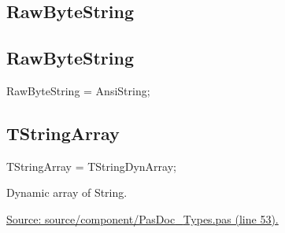 \documentclass{report}
\newif\ifpdf
\begin{document}
\subsection*{\large{\textbf{RawByteString}}\normalsize\hspace{1ex}\hrulefill}
\else
\subsection*{RawByteString}
\fi
\label{PasDoc_Types-RawByteString}
\begin{list}{}{
\setlength{\itemindent}{0cm}
\setlength{\listparindent}{0cm}
\setlength{\leftmargin}{\evensidemargin}
\addtolength{\leftmargin}{\tmplength}
\settowidth{\labelsep}{X}
\addtolength{\leftmargin}{\labelsep}
\setlength{\labelwidth}{\tmplength}
}
\item[\textbf{Declaration}\hfill]
\ifpdf
\begin{flushleft}
\fi
\begin{ttfamily}
RawByteString = AnsiString;\end{ttfamily}

\ifpdf
\end{flushleft}
\fi

\end{list}
\ifpdf
\subsection*{\large{\textbf{TStringArray}}\normalsize\hspace{1ex}\hrulefill}
\else
\subsection*{TStringArray}
\fi
\label{PasDoc_Types-TStringArray}
\begin{list}{}{
\setlength{\itemindent}{0cm}
\setlength{\listparindent}{0cm}
\setlength{\leftmargin}{\evensidemargin}
\addtolength{\leftmargin}{\tmplength}
\settowidth{\labelsep}{X}
\addtolength{\leftmargin}{\labelsep}
\setlength{\labelwidth}{\tmplength}
}
\item[\textbf{Declaration}\hfill]
\ifpdf
\begin{flushleft}
\fi
\begin{ttfamily}
TStringArray = TStringDynArray;\end{ttfamily}

\ifpdf
\end{flushleft}
\fi

\par
\item[\textbf{Description}]
Dynamic array of String.\par
\href{https://github.com/pasdoc/pasdoc/blob/master/source/component/PasDoc_Types.pas#L53}{Source: source/component/PasDoc{\_}Types.pas (line 53).}

\end{list}
\ifpdf
\end{document}
